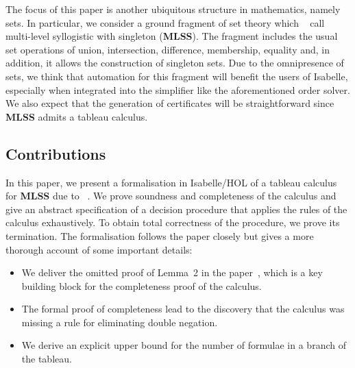\documentclass[sigplan,10pt,anonymous,review]{acmart}
\newcommand{\MLSS}{\textbf{MLSS}}
\begin{document}
The focus of this paper is another ubiquitous structure in mathematics, namely sets.
In particular, we consider a ground fragment of set theory which \citeauthor{new_fast_tableau}~\cite{new_fast_tableau} call multi-level syllogistic with singleton (\MLSS{}).
The fragment includes the usual set operations of union, intersection, difference, membership, equality and, in addition, it allows the construction of singleton sets.
Due to the omnipresence of sets, we think that automation for this fragment will benefit the users of Isabelle, especially when integrated into the simplifier like the aforementioned order solver.
We also expect that the generation of certificates will be straightforward since \MLSS{} admits a tableau calculus.

\subsection{Contributions}
In this paper, we present a formalisation in Isabelle/HOL of a tableau calculus for \MLSS{} due to \citeauthor{new_fast_tableau}~\cite{new_fast_tableau}\cite[Chapter 14]{set_theory}.
We prove soundness and completeness of the calculus and give an abstract specification of a decision procedure that applies the rules of the calculus exhaustively.
To obtain total correctness of the procedure, we prove its termination.
The formalisation follows the paper closely but gives a more thorough account of some important details:
\begin{itemize}
  \item We deliver the omitted proof of Lemma~2 in the paper~\cite{new_fast_tableau}, which is a key building block for the completeness proof of the calculus.
  \item The formal proof of completeness lead to the discovery that the calculus was missing a rule for eliminating double negation. 
  \item We derive an explicit upper bound for the number of formulae in a branch of the tableau.
\end{itemize}
\end{document}
